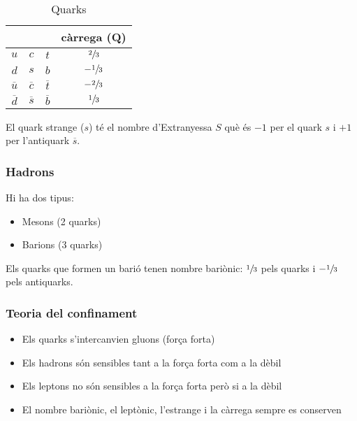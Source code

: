 \begin{table}[H]
    \centering
    \caption{Quarks}
    \label{tab:quarks}
    \begin{tabular}{cccc}
        \toprule
        & & & càrrega (Q) \\
        \midrule
        $u$ & $c$ & $t$ & $\sfrac{2}{3}$ \\
        $d$ & $s$ & $b$ & $-\sfrac{1}{3}$  \\
        $\overline{u}$ & $\overline{c}$ & $\overline{t}$ & $-\sfrac{2}{3}$  \\
        $\overline{d}$ & $\overline{s}$ & $\overline{b}$ & $\sfrac{1}{3}$ \\
        \bottomrule
    \end{tabular}
\end{table}

El quark strange ($s$) té el nombre d'Extranyessa $S$ què és $-1$ per el 
quark $s$ i  $+1$ per l'antiquark $\overline{s}$.

\subsubsection{Hadrons}
\label{ssub:hadrons}

Hi ha dos tipus:

\begin{itemize}
    \item Mesons (2 quarks)
    \item Barions (3 quarks)
\end{itemize}

Els quarks que formen un barió tenen nombre bariònic: $\sfrac{1}{3}$ pels quarks
i $-\sfrac{1}{3}$ pels antiquarks.

\subsubsection{Teoria del confinament}
\label{ssub:teoria_del_confinament}

\begin{itemize}
    \item Els quarks s'intercanvien gluons (força forta)
    \item Els hadrons són sensibles tant a la força forta com a la dèbil
    \item Els leptons no són sensibles a la força forta però si a la dèbil
    \item El nombre bariònic, el leptònic, l'estrange i la càrrega sempre es
    conserven
\end{itemize}

